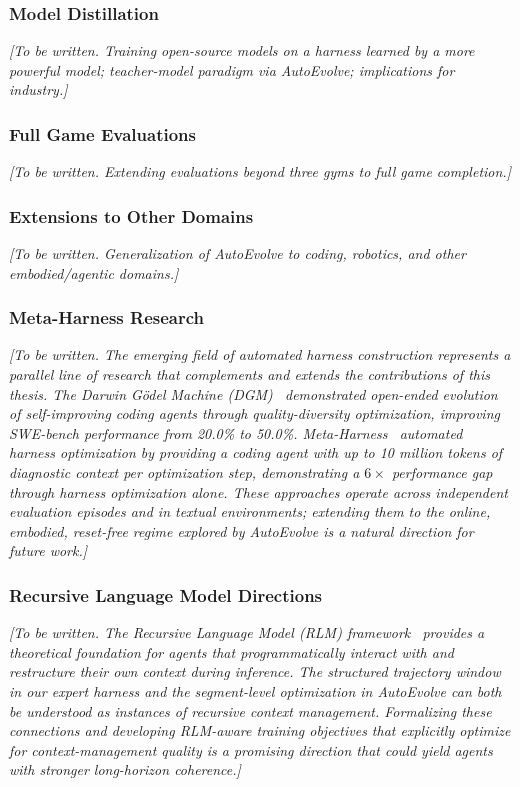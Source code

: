 \subsubsection{Model Distillation}\label{sec:distillation}

\textit{[To be written. Training open-source models on a harness learned by a more powerful model; teacher-model paradigm via AutoEvolve; implications for industry.]}

\subsubsection{Full Game Evaluations}\label{sec:full_game}

\textit{[To be written. Extending evaluations beyond three gyms to full game completion.]}

\subsubsection{Extensions to Other Domains}\label{sec:extensions}

\textit{[To be written. Generalization of AutoEvolve to coding, robotics, and other embodied/agentic domains.]}

\subsubsection{Meta-Harness Research}\label{sec:meta_harness_future}

\textit{[To be written. The emerging field of automated harness construction represents a parallel line of research that complements and extends the contributions of this thesis. The Darwin G\"{o}del Machine (DGM)~\citep{zhang2025dgm} demonstrated open-ended evolution of self-improving coding agents through quality-diversity optimization, improving SWE-bench performance from 20.0\% to 50.0\%. Meta-Harness~\citep{lee2026metaharness} automated harness optimization by providing a coding agent with up to 10 million tokens of diagnostic context per optimization step, demonstrating a $6\times$ performance gap through harness optimization alone. These approaches operate across independent evaluation episodes and in textual environments; extending them to the online, embodied, reset-free regime explored by AutoEvolve is a natural direction for future work.]}

\subsubsection{Recursive Language Model Directions}\label{sec:rlm_future}

\textit{[To be written. The Recursive Language Model (RLM) framework~\citep{zhang2025rlm} provides a theoretical foundation for agents that programmatically interact with and restructure their own context during inference. The structured trajectory window in our expert harness and the segment-level optimization in AutoEvolve can both be understood as instances of recursive context management. Formalizing these connections and developing RLM-aware training objectives that explicitly optimize for context-management quality is a promising direction that could yield agents with stronger long-horizon coherence.]}
